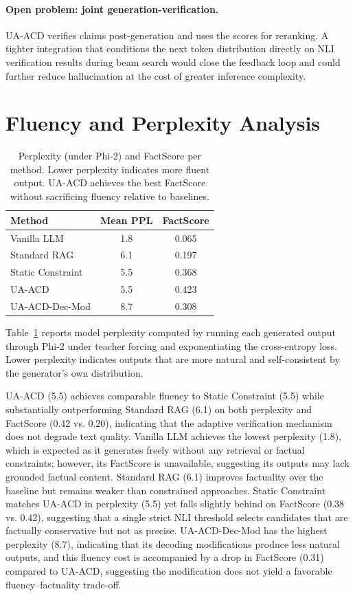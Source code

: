 \documentclass[11pt]{article}
\begin{document}
\paragraph{Open problem: joint generation-verification.}
UA-ACD verifies claims post-generation and uses the scores for reranking. A tighter integration that conditions the next token distribution directly on NLI verification results during beam search \citep{de2021constrained} would close the feedback loop and could further reduce hallucination at the cost of greater inference complexity.

\section{Fluency and Perplexity Analysis}
\label{sec:perplexity}

\begin{table}[t]
\centering
\small
\begin{tabular}{lcc}
\toprule
\textbf{Method} & \textbf{Mean PPL} & \textbf{FactScore} \\
\midrule
Vanilla LLM       & 1.8 & 0.065 \\
Standard RAG      & 6.1 & 0.197 \\
Static Constraint & 5.5 & 0.368 \\
UA-ACD            & 5.5 & 0.423 \\
UA-ACD-Dec-Mod    & 8.7 & 0.308 \\
\bottomrule
\end{tabular}
\caption{Perplexity (under Phi-2) and FactScore per method. Lower perplexity indicates more fluent output. UA-ACD achieves the best FactScore without sacrificing fluency relative to baselines.}
\label{tab:perplexity}
\end{table}

Table~\ref{tab:perplexity} reports model perplexity computed by running each generated output through Phi-2 under teacher forcing and exponentiating the cross-entropy loss. Lower perplexity indicates outputs that are more natural and self-consistent by the generator's own distribution.

UA-ACD (5.5) achieves comparable fluency to Static Constraint (5.5) while substantially outperforming Standard RAG (6.1) on both perplexity and FactScore (0.42 vs. 0.20), indicating that the adaptive verification mechanism does not degrade text quality. Vanilla LLM achieves the lowest perplexity (1.8), which is expected as it generates freely without any retrieval or factual constraints; however, its FactScore is unavailable, suggesting its outputs may lack grounded factual content. Standard RAG (6.1) improves factuality over the baseline but remains weaker than constrained approaches. Static Constraint matches UA-ACD in perplexity (5.5) yet falls slightly behind on FactScore (0.38 vs. 0.42), suggesting that a single strict NLI threshold selects candidates that are factually conservative but not as precise. UA-ACD-Dec-Mod has the highest perplexity (8.7), indicating that its decoding modifications produce less natural outputs, and this fluency cost is accompanied by a drop in FactScore (0.31) compared to UA-ACD, suggesting the modification does not yield a favorable fluency–factuality trade-off.
\end{document}
